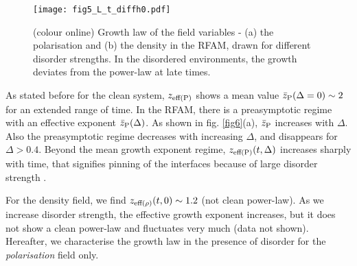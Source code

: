 \documentclass[pre,twocolumn,amssymb,showpacs,superscriptaddress,notitlepage]{revtex4-1}
\begin{document}

\begin{figure}[b]
  \begin{center}
  \texttt{[image: fig5\_L\_t\_diffh0.pdf]}
\caption{(colour online)
Growth law of the field variables - (a) the  polarisation and 
(b) the density in the RFAM, drawn for different disorder
strengths. In the disordered environments, the growth deviates from the power-law at late times.} 
\label{fig5}
\end{center}
\end{figure}


As stated before for the clean system,  $z_{\rm eff(P)}$ shows a mean value $\bar z_{\rm  P}(\Delta=0) \sim 2$ for 
 an extended range of time.  
In the RFAM, there is a preasymptotic regime with an effective exponent 
$\bar z_{\rm  P}(\Delta)$. As shown in fig. \ref{fig6}(a), $\bar z_{\rm  P}$ increases with $\Delta$.  
Also the preasymptotic regime decreases with increasing $\Delta$, and disappears for $\Delta>0.4$. 
Beyond the mean growth exponent regime, $z_{\rm eff(P)}(t,\Delta)$ increases sharply with time, 
that signifies pinning of the interfaces because of large disorder strength  \cite{purizannetti2011, equidis}. 

For the density field, we find $z_{\rm eff(\rho)}(t, 0) \sim 1.2$ (not clean power-law). 
 As we increase disorder strength, the effective growth exponent increases, but it does not show a clean power-law 
and fluctuates very much (data not shown).
Hereafter, we characterise the growth law in the presence of disorder for the {\it polarisation} field only. 
\end{document}
